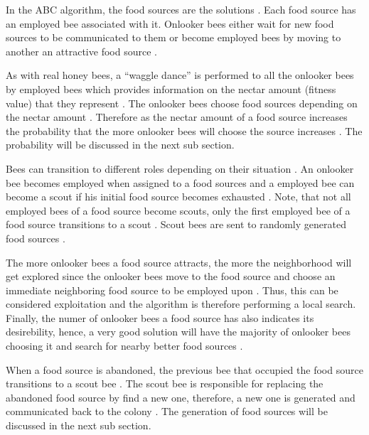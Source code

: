 In the ABC algorithm, the food sources are the solutions \cite{ABCCompareStudy,ABCNumericalOptimization}. Each food source has an employed bee associated with it. Onlooker bees either wait for new food sources to be communicated to them or become employed bees by moving to another an attractive food source \cite{ABCCompareStudy,ABCNumericalOptimization}. 

As with real honey bees, a ``waggle dance'' is performed to all the onlooker bees by employed bees which provides information on the nectar amount (fitness value) that they represent \cite{ABCReconfigDistro,ABCCompareStudy,ABCImageEnhancement}. The onlooker bees choose food sources depending on the nectar amount \cite{ABCReconfigDistro,ABCCompareStudy,ABCImageEnhancement}. Therefore as the nectar amount of a food source increases the probability that the more onlooker bees will choose the source increases \cite{ABCReconfigDistro,ABCCompareStudy,ABCImageEnhancement}. The probability will be discussed in the next sub section.

Bees can transition to different roles depending on their situation \cite{ABCCompareStudy,ABCNumericalOptimization}. An onlooker bee becomes employed when assigned to a food sources and a employed bee can become a scout if his initial food source becomes exhausted \cite{ABCImageEnhancement,ABCCompareStudy,ABCReconfigDistro}. Note, that not all employed bees of a food source become scouts, only the first employed bee of a food source transitions to a scout \cite{ABCImageEnhancement,ABCCompareStudy,ABCReconfigDistro}. Scout bees are sent to randomly generated food sources \cite{ABCImageEnhancement,ABCCompareStudy,ABCReconfigDistro}. 

The more onlooker bees a food source attracts, the more the neighborhood will get explored since the onlooker bees move to the food source and choose an immediate neighboring food source to be employed upon \cite{ABCCompareStudy,ABCNumericalOptimization}. Thus, this can be considered exploitation and the algorithm is therefore performing a local search. Finally, the numer of onlooker bees a food source has also indicates its desirebility, hence, a very good solution will have the majority of onlooker bees choosing it and search for nearby better food sources \cite{ABCCompareStudy,ABCReconfigDistro,ABCNumericalOptimization}.

When a food source is abandoned, the previous bee that occupied the food source transitions to a scout bee \cite{ABCCompareStudy,ABCNumericalOptimization}. The scout bee is responsible for replacing the abandoned food source by find a new one, therefore, a new one is generated and communicated back to the colony \cite{ABCCompareStudy,ABCImageEnhancement,ABCNumericalOptimization}. The generation of food sources will be discussed in the next sub section.

